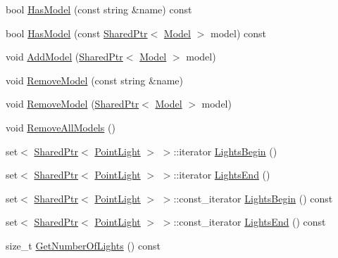 \begin{DoxyCompactItemize}
\item 
bool \hyperlink{classmage_1_1_world_a381e0a56fc1ba6d0955a248f7b0f0c22}{Has\+Model} (const string \&name) const
\item 
bool \hyperlink{classmage_1_1_world_a821d420241b2a94502b20e24595490df}{Has\+Model} (const \hyperlink{namespacemage_a1e01ae66713838a7a67d30e44c67703e}{Shared\+Ptr}$<$ \hyperlink{classmage_1_1_model}{Model} $>$ model) const
\item 
void \hyperlink{classmage_1_1_world_a4b7287a11ff316b029ec7727ed0d076d}{Add\+Model} (\hyperlink{namespacemage_a1e01ae66713838a7a67d30e44c67703e}{Shared\+Ptr}$<$ \hyperlink{classmage_1_1_model}{Model} $>$ model)
\item 
void \hyperlink{classmage_1_1_world_aebba267c6c47de1c806ffe49be273dea}{Remove\+Model} (const string \&name)
\item 
void \hyperlink{classmage_1_1_world_afad0c7024fcd304bb582bdc1d281c590}{Remove\+Model} (\hyperlink{namespacemage_a1e01ae66713838a7a67d30e44c67703e}{Shared\+Ptr}$<$ \hyperlink{classmage_1_1_model}{Model} $>$ model)
\item 
void \hyperlink{classmage_1_1_world_af3bae7b62192de9edda5e0567b73be93}{Remove\+All\+Models} ()
\item 
set$<$ \hyperlink{namespacemage_a1e01ae66713838a7a67d30e44c67703e}{Shared\+Ptr}$<$ \hyperlink{classmage_1_1_point_light}{Point\+Light} $>$ $>$\+::iterator \hyperlink{classmage_1_1_world_a48964d5262a080dd866e612d7daa6bf2}{Lights\+Begin} ()
\item 
set$<$ \hyperlink{namespacemage_a1e01ae66713838a7a67d30e44c67703e}{Shared\+Ptr}$<$ \hyperlink{classmage_1_1_point_light}{Point\+Light} $>$ $>$\+::iterator \hyperlink{classmage_1_1_world_a52c035bf11269bb9cc6fb537532bfeab}{Lights\+End} ()
\item 
set$<$ \hyperlink{namespacemage_a1e01ae66713838a7a67d30e44c67703e}{Shared\+Ptr}$<$ \hyperlink{classmage_1_1_point_light}{Point\+Light} $>$ $>$\+::const\+\_\+iterator \hyperlink{classmage_1_1_world_a45b3876de39fd5d7bd176f029cf4c535}{Lights\+Begin} () const
\item 
set$<$ \hyperlink{namespacemage_a1e01ae66713838a7a67d30e44c67703e}{Shared\+Ptr}$<$ \hyperlink{classmage_1_1_point_light}{Point\+Light} $>$ $>$\+::const\+\_\+iterator \hyperlink{classmage_1_1_world_a752ce259cdcffdfba51e2c9e480d2ddc}{Lights\+End} () const
\item 
size\+\_\+t \hyperlink{classmage_1_1_world_a786420d8d8b97065ee591753b7f1541b}{Get\+Number\+Of\+Lights} () const
\item 

\end{DoxyCompactItemize}

